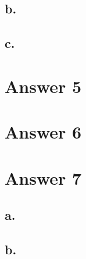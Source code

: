 \documentclass[12pt]{article}
\begin{document}
\subsection*{b.}

\subsection*{c.}



\section*{Answer 5}



\section*{Answer 6}



\section*{Answer 7}

\subsection*{a.}

\subsection*{b.}
\end{document}
